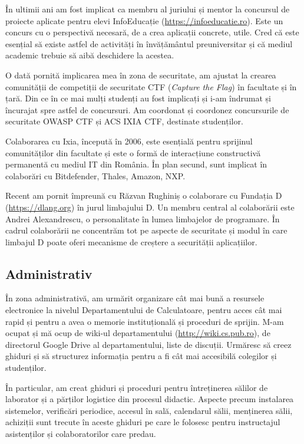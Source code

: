 \documentclass[11pt,a4paper]{article}
\begin{document}
În ultimii ani am fost implicat ca membru al juriului și mentor la concursul de proiecte aplicate pentru elevi InfoEducație (\url{https://infoeducatie.ro}). Este un concurs cu o perspectivă necesară, de a crea aplicații concrete, utile. Cred că este esențial să existe astfel de activități în învățământul preuniversitar și că mediul academic trebuie să aibă deschidere la acestea.

O dată pornită implicarea mea în zona de securitate, am ajustat la crearea comunității de competiții de securitate CTF (\textit{Capture the Flag}) în facultate și în țară. Din ce în ce mai mulți studenți au fost implicați și i-am îndrumat și încurajat spre astfel de concursuri. Am coordonat și coordonez concursurile de securitate OWASP CTF și ACS IXIA CTF, destinate studenților.

Colaborarea cu Ixia, începută în 2006, este esențială pentru sprijinul comunităților din facultate și este o formă de interacțiune constructivă permanentă cu mediul IT din România. În plan secund, sunt implicat în colaborări cu Bitdefender, Thales, Amazon, NXP.

Recent am pornit împreună cu Răzvan Rughiniș o colaborare cu Fundația D (\url{https://dlang.org}) în jurul limbajului D. Un membru central al colaborării este Andrei Alexandrescu, o personalitate în lumea limbajelor de programare. În cadrul colaborării ne concentrăm tot pe aspecte de securitate și modul în care limbajul D poate oferi mecanisme de creștere a securității aplicațiilor.

\subsection*{Administrativ}

În zona administrativă, am urmărit organizare cât mai bună a resursele electronice la nivelul Departamentului de Calculatoare, pentru acces cât mai rapid și pentru a avea o memorie instituțională și proceduri de sprijin. M-am ocupat și mă ocup de wiki-ul departamentului (\url{http://wiki.cs.pub.ro}), de directorul Google Drive al departamentului, liste de discuții. Urmăresc să creez ghiduri și să structurez informația pentru a fi cât mai accesibilă colegilor și studenților.

În particular, am creat ghiduri și proceduri pentru întreținerea sălilor de laborator și a părților logistice din procesul didactic. Aspecte precum instalarea sistemelor, verificări periodice, accesul în sală, calendarul sălii, menținerea sălii, achiziții sunt trecute în aceste ghiduri pe care le folosesc pentru instructajul asistenților și colaboratorilor care predau.
\end{document}

